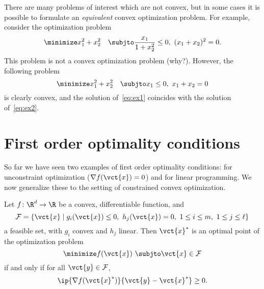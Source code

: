 \begin{remark}
 There are many problems of interest which are not convex, but in some cases it is possible to formulate an {\em equivalent} convex optimization problem. For example, consider the optimization problem
 \begin{equation}\label{eq:ex1}
  \minimize x_1^2+x_2^2 \quad \subjto \frac{x_1}{1+x_2^2}\leq 0, \ (x_1+x_2)^2=0.
 \end{equation}
This problem is not a convex optimization problem (why?). However, the following problem
\begin{equation}\label{eq:ex2}
 \minimize x_1^2+x_2^2 \quad \subjto x_1\leq 0, \ x_1+x_2=0
\end{equation}
is clearly convex, and the solution of~\eqref{eq:ex1} coincides with the solution of~\eqref{eq:ex2}.
\end{remark}

\section{First order optimality conditions}
So far we have seen two examples of first order optimality conditions: for unconstraint optimization ($\nabla f(\vct{x})=0$) and for linear programming. We now generalize these to the setting of constrained convex optimization.

\begin{theorem}
 Let $f\colon \R^d\to \R$ be a convex, differentiable function, and 
 \begin{equation*}
  \mathcal{F}=\{\vct{x} \mid g_i(\vct{x})\leq 0, \ h_j(\vct{x})=0, \ 1\leq i\leq m, \ 1\leq j\leq \ell\}
 \end{equation*}
a feasible set, with $g_i$ convex and $h_j$ linear. Then $\vct{x}^*$ is an optimal point of the optimization problem
\begin{equation*}
 \minimize f(\vct{x}) \ \subjto \vct{x}\in \mathcal{F}
\end{equation*}
if and only if for all $\vct{y}\in \mathcal{F}$, 
\begin{equation}\label{eq:opt}
 \ip{\nabla f(\vct{x}^*)}{\vct{y}-\vct{x}^*}\geq 0.
\end{equation}
\end{theorem}

